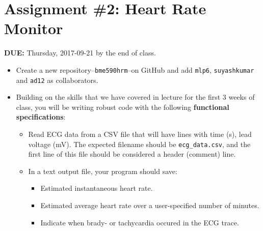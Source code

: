 


\section*{Assignment \#2: Heart Rate Monitor}

{\bf DUE:} Thursday, 2017-09-21 by the end of class.

\begin{itemize}

\item Create a new repository--\verb+bme590hrm+--on GitHub and add \verb+mlp6+,
\verb+suyashkumar+ and \verb+ad12+ as collaborators.

\item Building on the skills that we have covered in lecture for the first 3
weeks of class, you will be writing robust code with the following
\textbf{functional specifications}:

\begin{itemize}
    \item Read ECG data from a CSV file that will have lines with time (s), lead voltage (mV).  The expected filename should be \verb+ecg_data.csv+, and the first line of this file should be considered a header (comment) line.
    \item In a text output file, your program should save:
    \begin{itemize}
        \item Estimated instantaneous heart rate.
        \item Estimated average heart rate over a user-specified number of minutes.
        \item Indicate when brady- or tachycardia occured in the ECG trace.
    \end{itemize}
\end{itemize}


\end{itemize}
